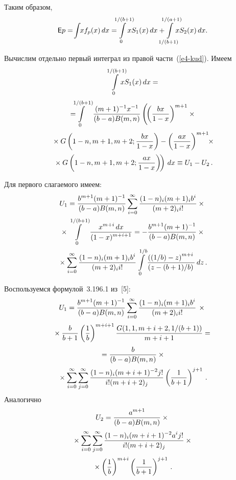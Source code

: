 \begin{multicols}{2}
Таким образом,
\begin{equation}
{\sf E} p =\! \il{}{}\hspace*{-1mm}xf_p(x)\,dx=\hspace*{-3mm}\il{0}{1/(b+1)}
\hspace*{-3.2mm}xS_{1}(x)\, dx +
\hspace*{-3.2mm}\il{1/(b+1)}{1/(a+1)} \hspace*{-3mm}xS_{2}(x)\, dx.\label{e4-kud}
\end{equation}

Вычислим отдельно первый интеграл из правой части~(\ref{e4-kud}). Имеем
\begin{multline*}
\il{0}{1/(b+1)} \hspace*{-3mm}xS_{1}(x)\, dx = {}\\[2pt]
{}=\hspace*{-3mm}\il{0}{1/(b+1)}
\fr{(m+1)^{-1}x^{-1}}{(b-a)B(m,n)} \left(\! \left(
\fr{bx}{1-x} \right)^{m+1}\times{}\right.\\[2pt]
\left.{}\times G\left(1-n,m+1, m+2; \fr{bx}{1-x}\right)  -
 \left( \fr{ax}{1-x} \right)^{m+1}\!\!\times{} \right.\hspace*{-2.315315pt}\\[2pt]
\left.{} \times G\left(
1-n,m+1,m+2; \fr{ax}{1-x}\right)  \!\right)\, dx\equiv U_1-U_2\,.\hspace*{-0.19241pt}
\end{multline*}

Для первого слагаемого имеем:
\begin{multline*}
U_1 = \fr{b^{m+1}(m+1)^{-1}}{(b-a)B(m,n)} \sum\limits_{i=0}^{\infty}
\fr{(1-n)_i(m+1)_i  b^i}{(m+2)_i i!}\times{}\\
{}\times
\il{0}{1/(b+1)} \fr{x^{m+i}\,dx}{(1-x)^{m+i+1}} =
- \fr{b^{m+1}(m+1)^{-1}}{(b-a)B(m,n)} \times{}\\
{}\times \sum\limits_{i=0}^{\infty}
\fr{(1-n)_i(m+1)_i  b^i}{(m+2)_i i!} \il{0}{1/b}
\fr{\left( (1/b) - z  \right) ^{m+i}}{\left( z - (b+1)/b \right) }\, dz\,.
\end{multline*}

Воспользуемся формулой~3.196.1 из~[5]:
\begin{multline*}
 U_1 = \fr{b^{m+1}(m+1)^{-1}}{(b-a)B(m,n)}
 \sum\limits_{i=0}^{\infty} \fr{(1-n)_i(m+1)_i b^i}{(m+2)_i i!}\,
 \times{}\\[2pt]
 {}\times
 \fr{b}{b+1}\left( \fr{1}{b} \right)^{m+i+1}
 \fr{G(1,1,m+i+2,{1/(b+1)})}{m+i+1} ={}\\[2pt]
{} = \fr{b}{(b-a)B(m,n)} \times{}\\[2pt]
{}\times\sum\limits_{i=0}^{\infty}
\sum\limits_{j=0}^{\infty}
\fr{(1-n)_i(m+i+1)^{-2}j!}{i!(m+i+2)_{j}} \left( \fr{1}{b+1} \right)^{j+1}\,.
\end{multline*}
Аналогично
\begin{multline*}
U_2 = \fr{a^{m+1}}{(b-a)B(m,n)}\times{}\\[2pt]
{}\times
\sum\limits_{i=0}^{\infty} \sum\limits_{j=0}^{\infty}
\fr{(1-n)_i(m+i+1)^{-2}a^ij!}{ i!(m+i+2)_{j}}\times{}\\[2pt]
{}\times \left( \fr{1}{b}
\right)^{m+i}\left( \fr{1}{b+1} \right)^{j+1}\,.
\end{multline*}


\end{multicols}
